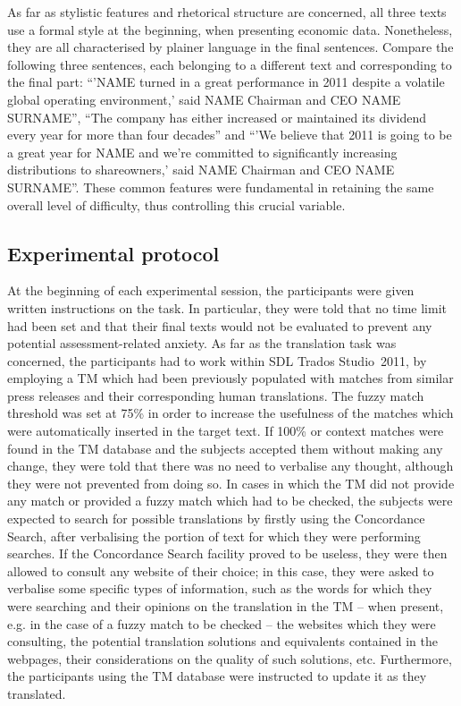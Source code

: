 \documentclass[output=paper]{LSP/langsci}
\begin{document}
\newpage 
As far as stylistic features and rhetorical structure are concerned, all three texts use a formal style at the beginning, when presenting economic data. Nonetheless, they are all characterised by plainer language in the final sentences. Compare the following three sentences, each belonging to a different text and corresponding to the final part: ``'NAME turned in a great performance in 2011 despite a volatile global operating environment,' said NAME Chairman and CEO NAME SURNAME'', ``The company has either increased or maintained its dividend every year for more than four decades'' and ``'We believe that 2011 is going to be a great year for NAME and we're committed to significantly increasing distributions to shareowners,'{\textquotedbl} said NAME Chairman and CEO NAME SURNAME''. These common features were fundamental in retaining the same overall level of difficulty, thus controlling this crucial variable.

\subsection{Experimental protocol}\label{ressetti-gaspari:sec:3.3}


At the beginning of each experimental session, the participants were given written instructions on the task. In particular, they were told that no time limit had been set and that their final texts would not be evaluated to prevent any potential assessment-related anxiety. As far as the translation task was concerned, the participants had to work within SDL Trados Studio~2011, by employing a TM which had been previously populated with matches from similar press releases and their corresponding human translations. The fuzzy match threshold was set at 75\% in order to increase the usefulness of the matches which were automatically inserted in the target text. If 100\% or context matches were found in the TM database and the subjects accepted them without making any change, they were told that there was no need to verbalise any thought, although they were not prevented from doing so. In cases in which the TM did not provide any match or provided a fuzzy match which had to be checked, the subjects were expected to search for possible translations by firstly using the Concordance Search, after verbalising the portion of text for which they were performing searches. If the Concordance Search facility proved to be useless, they were then allowed to consult any website of their choice; in this case, they were asked to verbalise some specific types of information, such as the words for which they were searching and their opinions on the translation in the TM -- when present, e.g. in the case of a fuzzy match to be checked -- the websites which they were consulting, the potential translation solutions and equivalents contained in the webpages, their considerations on the quality of such solutions, etc. Furthermore, the participants using the TM database were instructed to update it as they translated.
\end{document}
